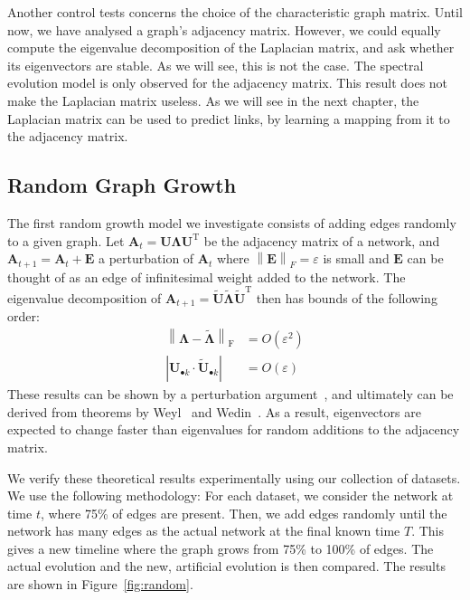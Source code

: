 \documentclass[11pt,a4paper]{book}
\begin{document}
Another control tests concerns the choice of the characteristic graph
matrix.  Until now, we have analysed a graph's adjacency matrix.
However, we could equally compute the eigenvalue decomposition of the
Laplacian matrix, and ask whether its eigenvectors are stable.  As we
will see, this is not the case.  The spectral evolution model is only
observed for the adjacency matrix.  This result does not make the
Laplacian matrix useless. As we will see in the next chapter, the
Laplacian matrix can be used to predict links, by learning a mapping
from it to the adjacency matrix.  

\subsection{Random Graph Growth}
The first random growth model we investigate consists of adding edges 
randomly to a given graph. 
Let $\mathbf A_{t}=\mathbf U \mathbf
\Lambda \mathbf U^{\mathrm T}$ be the adjacency matrix of a network, and $\mathbf
A_{t+1} = \mathbf A_{t}+\mathbf E$ a perturbation of $\mathbf
A_{t}$ where $\left\| \mathbf E \right\|_F=\varepsilon$ is small and
$\mathbf E$ can be thought of as an edge of infinitesimal weight added to
the network.  
The eigenvalue
decomposition of $\mathbf A_{t+1}=\tilde {\mathbf U} \tilde {\mathbf
  \Lambda} \tilde {\mathbf U}^{\mathrm T}$ then has bounds of the
following order: 
\begin{align}
  \left\| \mathbf \Lambda - \tilde {\mathbf \Lambda} \right\|_{\mathrm F} &=
  O(\varepsilon^2) \\  
  \left|\mathbf U_{\bullet k} \cdot \tilde {\mathbf U}_{\bullet
    k}^{\phantom{\mathrm I}}\right| &= O(\varepsilon)
\end{align}
These results can be shown by a perturbation argument~\cite{b528}, and
ultimately can be derived from theorems by
Weyl~\cite{b632} and Wedin~\cite{b633}. 
As a result,
eigenvectors are expected to change faster than eigenvalues for random
additions to the adjacency matrix.  

We verify these theoretical results experimentally using our collection
of datasets.  We use the following methodology:  For each dataset, we
consider the network at time $t$, where 75\% of edges are present.
Then, we add edges randomly until the network has many edges as the
actual network at the final known time $T$.  This gives a new timeline
where the graph grows from 75\% to 100\% of edges.  The actual evolution
and the new, artificial evolution is then compared.  The results are shown
in Figure~\ref{fig:random}.  
\end{document}
